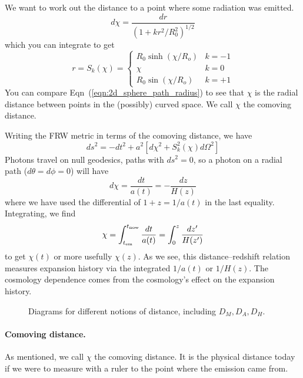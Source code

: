 We want to work out the distance to a point where some radiation was emitted.
\begin{equation}
  d\chi = \frac{dr}{(1 + kr^2/R_0^2)^{1/2}}
\end{equation}
which you can integrate to get
\begin{equation}
  r = S_k(\chi) = \left\{
  \begin{array}{ll}
    R_0 \sinh(\chi/R_o) &  k=-1 \\
    \chi & k=0 \\
    R_0 \sin(\chi/R_o) &  k=+1
  \end{array}
  \right.
\end{equation}
You can compare Eqn~(\ref{eqn:2d_sphere_path_radius}) to see that $\chi$ is the radial distance between points in the (possibly) curved space.  We call $\chi$ the comoving distance.

Writing the FRW metric in terms of the comoving distance, we have
\begin{equation}
  ds^2 = -dt^2 + a^2 \left[ d\chi^2 + S_k^2(\chi) d\Omega^2 \right]
\end{equation}
Photons travel on null geodesics, paths with $ds^2 = 0$, so a photon on a radial path ($d\theta = d\phi = 0$) will have
\begin{equation}
  d\chi = \frac{dt}{a(t)} = - \frac{dz}{H(z)}
\end{equation}
where we have used the differential of $1+z = 1/a(t)$ in the last equality.  Integrating, we find
\begin{equation}
  \chi = \int_{t_{\rm em}}^{t_{\rm now}} \frac{dt}{a(t)} = \int_0^z \frac{dz'}{H(z')}  
\end{equation}
to get $\chi(t)$ or more usefully $\chi(z)$. As we see, this distance--redshift relation measures expansion history via the integrated $1/a(t)$ or $1/H(z)$.  The cosmology dependence comes from the cosmology's effect on the expansion history.

\begin{figure}

  \caption{Diagrams for different notions of distance, including $D_M,D_A,D_H$.}
  \label{fig:distances1}
\end{figure}


\paragraph{Comoving distance.}
As mentioned, we call $\chi$ the comoving distance.  It is the physical distance today if we were to measure with a ruler to the point where the emission came from.

